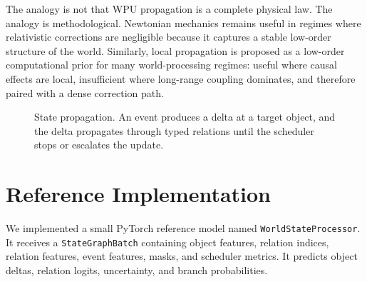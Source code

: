 \documentclass[11pt]{article}
\begin{document}
The analogy is not that WPU propagation is a complete physical law. The analogy
is methodological. Newtonian mechanics remains useful in regimes where
relativistic corrections are negligible because it captures a stable low-order
structure of the world. Similarly, local propagation is proposed as a low-order
computational prior for many world-processing regimes: useful where causal
effects are local, insufficient where long-range coupling dominates, and
therefore paired with a dense correction path.

\begin{figure}[t]
\centering
{}
\caption{State propagation. An event produces a delta at a target object, and
the delta propagates through typed relations until the scheduler stops or
escalates the update.}
\label{fig:propagation}
\end{figure}

\section{Reference Implementation}

We implemented a small PyTorch reference model named
\texttt{WorldStateProcessor}. It receives a \texttt{StateGraphBatch} containing
object features, relation indices, relation features, event features, masks, and
scheduler metrics. It predicts object deltas, relation logits, uncertainty, and
branch probabilities.
\end{document}
